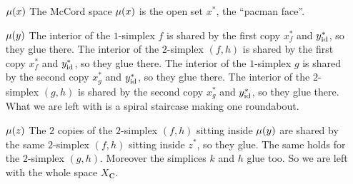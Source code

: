 \begin{example}
\begin{itemize}
	\item[$\operatorname{\mu}(x)$] The McCord space $\operatorname{\mu}(x)$ is the open set $x^*$, the ``pacman face''.
	\item[$\operatorname{\mu}(y)$] The interior of the $1$-simplex $f$ is shared by the first copy $x^*_f$ and $y^*_{\operatorname{id}}$, so they glue there. The interior of the $2$-simplex $(f,h)$ is shared by the first copy $x^*_f$ and $y^*_{\operatorname{id}}$, so they glue there. The interior of the $1$-simplex $g$ is shared by the second copy $x^*_g$ and $y^*_{\operatorname{id}}$, so they glue there. The interior of the $2$-simplex $(g,h)$ is shared by the second copy $x^*_g$ and $y^*_{\operatorname{id}}$, so they glue there. What we are left with is a spiral staircase making one roundabout.
	\item [$\operatorname{\mu}(z)$] The $2$ copies of the $2$-simplex $(f,h)$ sitting inside $\operatorname{\mu}(y)$ are shared by the same $2$-simplex $(f,h)$ sitting inside $z^*$, so they glue. The same holds for the $2$-simplex $(g,h)$. Moreover the simplices $k$ and $h$ glue too. So we are left with the whole space $X_\mathbf{C}$.
\end{itemize}
\end{example}

